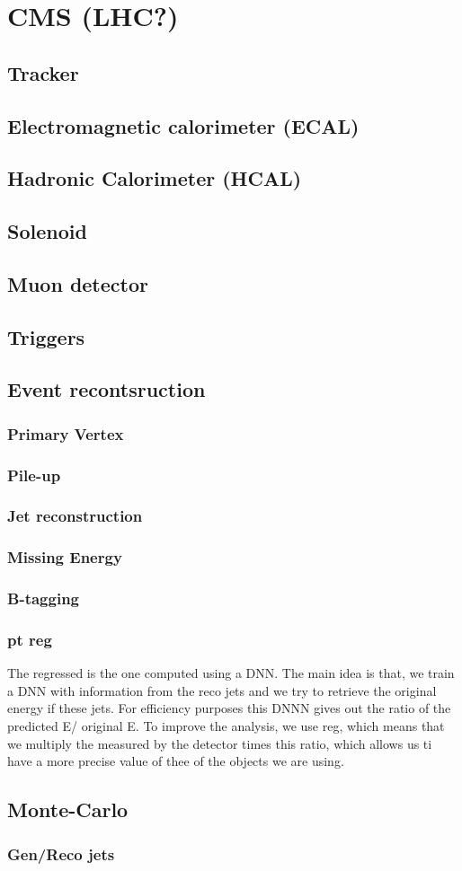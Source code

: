 \section{CMS (LHC?)}

\subsection{Tracker}
\subsection{Electromagnetic calorimeter (ECAL)}
\subsection{Hadronic Calorimeter (HCAL)}
\subsection{Solenoid}
\subsection{Muon detector}
\subsection{Triggers}
\subsection{Event recontsruction}
\subsubsection{Primary Vertex}
\subsubsection{Pile-up}
\subsubsection{Jet reconstruction}
\subsubsection{Missing Energy}
\subsubsection{B-tagging} \label{Btagging}
\subsubsection{pt reg} \label{subsubsec: btag-ptreg}
The \pt regressed is the one computed using a DNN. The main idea is that, we train a DNN with information from the reco jets and we try to retrieve the original energy if these jets. For efficiency purposes this DNNN gives out the ratio of the predicted E/ original E. To improve the analysis, we use \pt reg, which means that we multiply the \pt measured by the detector times this ratio, which allows us ti have a more precise value of thee \pt of the objects we are using.
\subsection{Monte-Carlo}
\subsubsection{Gen/Reco jets}